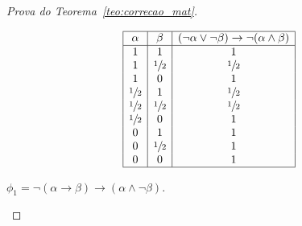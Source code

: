 \begin{proof}[Prova do Teorema~\ref{teo:correcao_mat}]
\begin{provaporcasos}
\begin{provaporsubcasos}
                    \begin{center}
                        \[
                            \begin{array}{|c|c|c|}%
                                \hline%
                                \alpha      & \beta & (\neg \alpha \lor \neg \beta) \to \neg (\alpha \land \beta) \\
                                \hline%
                                1 & 1 & 1\\
                                1 & \meio{} & \meio{}\\
                                1 & 0 & 1\\
                                \meio{} & 1 & \meio{}\\
                                \meio{} & \meio{} &\meio{}\\ 
                                \meio{} & 0 & 1\\
                                0 & 1 & 1\\
                                0 & \meio{} & 1\\
                                0 & 0 & 1\\
                                \hline%
                            \end{array}
                        \]
                    \end{center}

                    \subcasodeprova{} $\phi_{1} = \neg (\alpha \to \beta) \to(\alpha \land \neg \beta)$. 


\end{provaporsubcasos}
\end{provaporcasos}
\end{proof}
